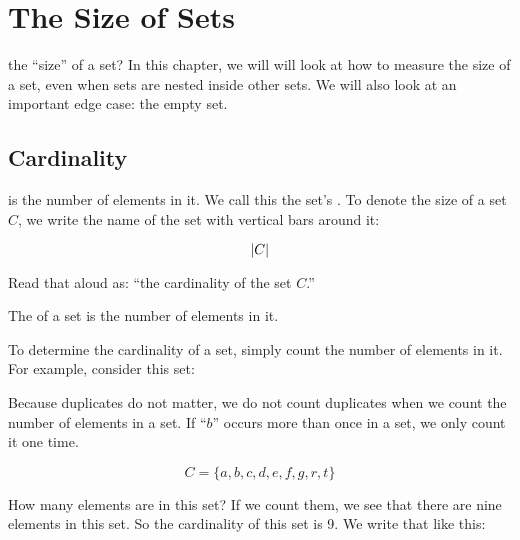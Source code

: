 \documentclass[../../../main.tex]{subfiles}
\begin{document}
\chapter{The Size of Sets}
\label{ch:the-size-of-sets}

 the ``size'' of a set? In this chapter, we will will look at how to measure the size of a set, even when sets are nested inside other sets. We will also look at an important edge case: the empty set.


\section{Cardinality}

 is the number of elements in it. We call this the set's . To denote the size of a set $C$, we write the name of the set with vertical bars around it:

\begin{equation*}
  |C|
\end{equation*}

Read that aloud as: ``the cardinality of the set $C$.''

\begin{terminology}
  The  of a set is the number of elements in it.
\end{terminology}

To determine the cardinality of a set, simply count the number of elements in it. For example, consider this set:

\begin{aside}
  \begin{remark}
    Because duplicates do not matter, we do not count duplicates when we count the number of elements in a set. If ``$b$'' occurs more than once in a set, we only count it one time.
  \end{remark}
\end{aside}

\begin{equation*}
  C = \{ a, b, c, d, e, f, g, r, t \}
\end{equation*}

How many elements are in this set? If we count them, we see that there are nine elements in this set. So the cardinality of this set is 9. We write that like this:
\end{document}
